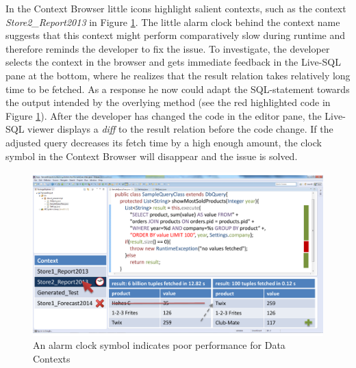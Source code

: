In the Context Browser little icons highlight salient contexts, such as the context \emph{Store2\_Report2013} in Figure \ref{fig:final_prototype_slow}. The little alarm clock behind the context name suggests that this context might perform comparatively slow during runtime and therefore reminds the developer to fix the issue. To investigate, the developer selects the context in the browser and gets immediate feedback in the Live-SQL pane at the bottom, where he realizes that the result relation takes relatively long time to be fetched. As a response he now could adapt the SQL-statement towards the output intended by the overlying method (see the red highlighted code in Figure \ref{fig:final_prototype_slow}). After the developer has changed the code in the editor pane, the Live-SQL viewer displays a \emph{diff} to the result relation before the code change. If the adjusted query decreases its fetch time by a high enough amount, the clock symbol in the Context Browser will disappear and the issue is solved.\\
\begin{figure}
\begin{centering}
    \includegraphics[width=1.0\linewidth]{images/slow}
    \caption{An alarm clock symbol indicates poor performance for Data Contexts}
    \label{fig:final_prototype_slow}
\end{centering}
\end{figure}
